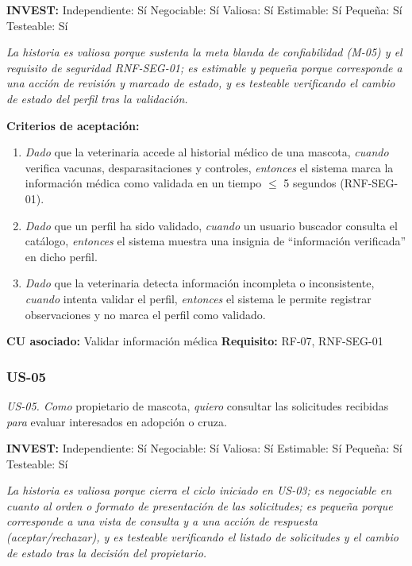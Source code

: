 \documentclass[journal,onecolumn]{IEEEtran}
\begin{document}
\textbf{INVEST:} Independiente: Sí \quad Negociable: Sí \quad
Valiosa: Sí \quad Estimable: Sí \quad
Pequeña: Sí \quad Testeable: Sí

\textit{La historia es valiosa porque sustenta la meta blanda de
confiabilidad (M-05) y el requisito de seguridad RNF-SEG-01; es estimable y
pequeña porque corresponde a una acción de revisión y marcado de estado, y
es testeable verificando el cambio de estado del perfil tras la
validación.}

\textbf{Criterios de aceptación:}
\begin{enumerate}[leftmargin=*]
  \item \textit{Dado} que la veterinaria accede al historial médico de una
  mascota, \textit{cuando} verifica vacunas, desparasitaciones y controles,
  \textit{entonces} el sistema marca la información médica como validada en
  un tiempo $\leq$ 5 segundos (RNF-SEG-01).
  \item \textit{Dado} que un perfil ha sido validado, \textit{cuando} un
  usuario buscador consulta el catálogo, \textit{entonces} el sistema
  muestra una insignia de ``información verificada'' en dicho perfil.
  \item \textit{Dado} que la veterinaria detecta información incompleta o
  inconsistente, \textit{cuando} intenta validar el perfil, \textit{entonces}
  el sistema le permite registrar observaciones y no marca el perfil como
  validado.
\end{enumerate}
\textbf{CU asociado:} Validar información médica \quad \textbf{Requisito:} RF-07, RNF-SEG-01

\subsubsection{US-05}

\begin{mdframed}[style=guia]
\textit{US-05. Como} propietario de mascota, \textit{quiero} consultar las
solicitudes recibidas \textit{para} evaluar interesados en adopción o
cruza.
\end{mdframed}

\textbf{INVEST:} Independiente: Sí \quad Negociable: Sí \quad
Valiosa: Sí \quad Estimable: Sí \quad
Pequeña: Sí \quad Testeable: Sí

\textit{La historia es valiosa porque cierra el ciclo iniciado en US-03; es
negociable en cuanto al orden o formato de presentación de las solicitudes;
es pequeña porque corresponde a una vista de consulta y a una acción de
respuesta (aceptar/rechazar), y es testeable verificando el listado de
solicitudes y el cambio de estado tras la decisión del propietario.}
\end{document}
